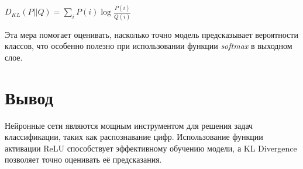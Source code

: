 \begin{math}
    D_{KL}(P || Q) = \sum_{i} P(i) \log \frac{P(i)}{Q(i)}
    \label{KLDivergence}
\end{math} \cite{lib:KLD}

Эта мера помогает оценивать, насколько точно модель предсказывает вероятности классов, 
что особенно полезно при использовании функции \textit{softmax} в выходном слое.

\section*{Вывод}

Нейронные сети являются мощным инструментом для решения задач классификации, таких как распознавание цифр. 
Использование функции активации ReLU способствует эффективному обучению модели, 
а KL Divergence позволяет точно оценивать её предсказания. 

\clearpage

